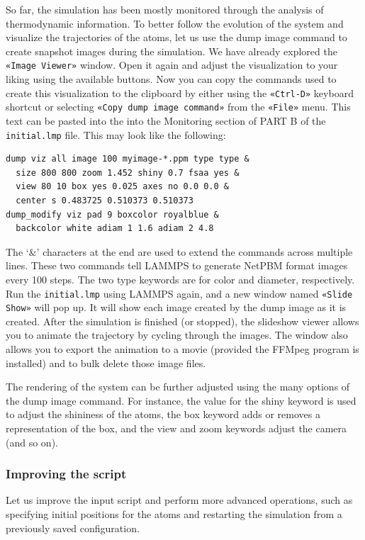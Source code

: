 \documentclass[9pt,tutorial]{livecoms}
\newcommand{\lmpcmd}[1]{\colorbox{listing}{\textcolor{command}{\small{#1}}}} %
\newcommand{\flecmd}[1]{\textcolor{command}{\texttt{#1}}} %
\newcommand{\guicmd}[1]{\textcolor{command}{\texttt{«#1»}}} %
\begin{document}
So far, the simulation has been mostly monitored through the analysis of
thermodynamic information.  To better follow the evolution of the system
and visualize the trajectories of the atoms, let us use the \lmpcmd{dump
  image} command to create snapshot images during the simulation.  We
have already explored the \guicmd{Image Viewer} window.  Open it again
and adjust the visualization to your liking using the available buttons.
Now you can copy the commands used to create this visualization to the
clipboard by either using the \guicmd{Ctrl-D} keyboard shortcut or
selecting \guicmd{Copy dump image command} from the \guicmd{File} menu.
This text can be pasted into the into the \lmpcmd{Monitoring} section
of \lmpcmd{PART B} of the \flecmd{initial.lmp} file.  This may look like
the following:
\begin{lstlisting}
dump viz all image 100 myimage-*.ppm type type &
  size 800 800 zoom 1.452 shiny 0.7 fsaa yes &
  view 80 10 box yes 0.025 axes no 0.0 0.0 &
  center s 0.483725 0.510373 0.510373
dump_modify viz pad 9 boxcolor royalblue &
  backcolor white adiam 1 1.6 adiam 2 4.8
\end{lstlisting}
The `$\&$' characters at the end are used to extend the
commands across multiple lines. These two commands tell LAMMPS to
generate NetPBM format images every 100
steps.  The two \lmpcmd{type} keywords are for \lmpcmd{color} and
\lmpcmd{diameter}, respectively.  Run the \flecmd{initial.lmp} using
LAMMPS again, and a new window named \guicmd{Slide Show} will pop up.
It will show each image created by the \lmpcmd{dump image} as it is
created. After the simulation is finished (or stopped), the slideshow
viewer allows you to animate the trajectory by cycling through the
images.  The window also allows you to export the animation to a movie
(provided the FFMpeg program is installed) and to bulk delete those
image files.

The rendering of the system can be further adjusted using the many
options of the \lmpcmd{dump image} command.  For instance, the value for the
\lmpcmd{shiny} keyword is used to adjust the shininess of the atoms, the
\lmpcmd{box} keyword adds or removes a representation of the box, and
the \lmpcmd{view} and \lmpcmd{zoom} keywords adjust the camera (and so
on).

\subsubsection{Improving the script}

Let us improve the input script and perform more advanced operations,
such as specifying initial positions for the atoms and restarting the
simulation from a previously saved configuration.
\end{document}

